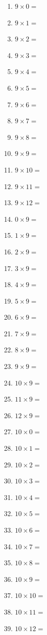 \documentclass{article}
\begin{document}
\begin{multicols}{4}
\begin{enumerate}
\item $9 \times 0 =$
\item $9 \times 1 =$
\item $9 \times 2 =$
\item $9 \times 3 =$
\item $9 \times 4 =$
\item $9 \times 5 =$
\item $9 \times 6 =$
\item $9 \times 7 =$
\item $9 \times 8 =$
\item $9 \times 9 =$
\item $9 \times 10 =$
\item $9 \times 11 =$
\item $9 \times 12 =$

\item $0 \times 9 =$
\item $1 \times 9 =$
\item $2 \times 9 =$
\item $3 \times 9 =$
\item $4 \times 9 =$
\item $5 \times 9 =$
\item $6 \times 9 =$
\item $7 \times 9 =$
\item $8 \times 9 =$
\item $9 \times 9 =$
\item $10 \times 9 =$
\item $11 \times 9 =$
\item $12 \times 9 =$

\item $10 \times 0 =$
\item $10 \times 1 =$
\item $10 \times 2 =$
\item $10 \times 3 =$
\item $10 \times 4 =$
\item $10 \times 5 =$
\item $10 \times 6 =$
\item $10 \times 7 =$
\item $10 \times 8 =$
\item $10 \times 9 =$
\item $10 \times 10 =$
\item $10 \times 11 =$
\item $10 \times 12 =$


\end{enumerate}
\end{multicols}
\end{document}
